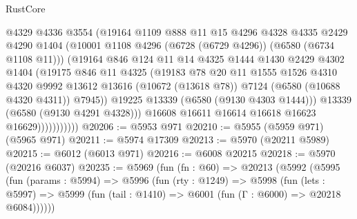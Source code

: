 \begin{lexlean}{RustCore}
\begin{coremodule}
                          @4329
                          @4336
                          @3554
                          (@19164
                            @1109
                            @888
                            @11
                            @15
                            @4296
                            @4328
                            @4335
                            @2429
                            @4290
                            @1404
                            (@10001 @1108 @4296 (@6728 (@6729 @4296)) (@6580 (@6734 @1108 @11)))
                            (@19164
                              @846
                              @124
                              @11
                              @14
                              @4325
                              @1444
                              @1430
                              @2429
                              @4302
                              @1404
                              (@19175
                                @846
                                @11
                                @4325
                                (@19183
                                  @78
                                  @20
                                  @11
                                  @1555
                                  @1526
                                  @4310
                                  @4320
                                  @9992
                                  @13612
                                  @13616
                                  (@10672 (@13618 @78))
                                  @7124
                                  (@6580 (@10688 @4320 @4311))
                                  @7945))
                              @19225
                              @13339
                              (@6580 (@9130 @4303 @1444)))
                            @13339
                            (@6580 (@9130 @4291 @4328)))
                          @16608
                          @16611
                          @16614
                          @16618
                          @16623
                          @16629)))))))))))
@20206 := @5953 @971
@20210 := @5955 (@5959 @971) (@5965 @971)
@20211 := @5974 @17309
@20213 := @5970 (@20211 @5989)
@20215 := @6012 (@6013 @971)
@20216 := @6008 @20215
@20218 := @5970 (@20216 @6037)
@20235 := @5969
    (fun (fn : @60) =>
    @20213
      (@5992
        (@5995
          (fun (params : @5994) =>
          @5996
            (fun (rty : @1249) =>
            @5998
              (fun (lets : @5997) =>
              @5999 (fun (tail : @1410) => @6001 (fun (Γ : @6000) => @20218 @6084))))))

\end{coremodule}
\end{lexlean}
